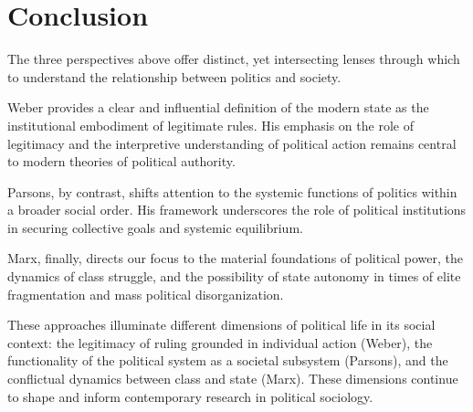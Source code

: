 \documentclass[12pt]{article}
\begin{document}
\section*{Conclusion}
The three perspectives above offer distinct, yet intersecting lenses through which to understand the relationship between politics and society.

Weber provides a clear and influential definition of the modern state as the institutional embodiment of legitimate rules. His emphasis on the role of legitimacy and the interpretive understanding of political action remains central to modern theories of political authority.

Parsons, by contrast, shifts attention to the systemic functions of politics within a broader social order. His framework underscores the role of political institutions in securing collective goals and systemic equilibrium.

Marx, finally, directs our focus to the material foundations of political power, the dynamics of class struggle, and the possibility of state autonomy in times of elite fragmentation and mass political disorganization. 

These approaches illuminate different dimensions of political life in its social context: the legitimacy of ruling grounded in individual action (Weber), the functionality of the political system as a societal subsystem (Parsons), and the conflictual dynamics between class and state (Marx). These dimensions continue to shape and inform contemporary research in political sociology.





\end{document}
